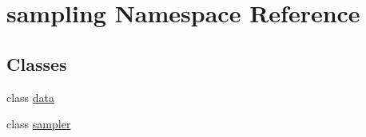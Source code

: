 \hypertarget{namespacesampling}{
\section{sampling Namespace Reference}
\label{namespacesampling}
}
\subsection*{Classes}
\begin{CompactItemize}
\item 
class \hyperlink{classsampling_1_1data}{data}
\item 
class \hyperlink{classsampling_1_1sampler}{sampler}
\end{CompactItemize}
